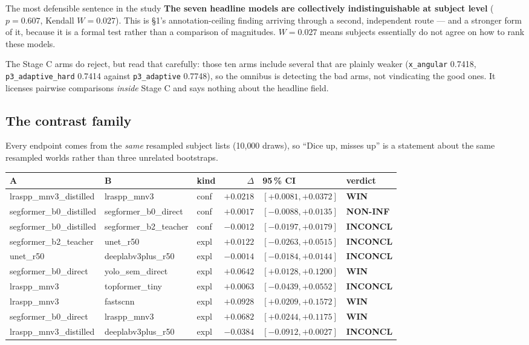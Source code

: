 \documentclass[11pt]{article}
\newcommand{\win}{\textcolor{wingreen}{\textbf{WIN}}}
\newcommand{\noninf}{\textcolor{secblue}{\textbf{NON-INF}}}
\newcommand{\inc}{\textcolor{warnamber}{\textbf{INCONCL}}}
\begin{document}
\begin{keybox}{The most defensible sentence in the study}
\textbf{The seven headline models are collectively indistinguishable at subject
level} ($p=0.607$, Kendall $W=0.027$). This is \S1's annotation-ceiling finding
arriving through a second, independent route --- and a stronger form of it,
because it is a formal test rather than a comparison of magnitudes. $W=0.027$
means subjects essentially do not agree on how to rank these models.
\end{keybox}

The Stage C arms do reject, but read that carefully: those ten arms include
several that are plainly weaker (\texttt{x\_angular} 0.7418,
\texttt{p3\_adaptive\_hard} 0.7414 against \texttt{p3\_adaptive} 0.7748), so the
omnibus is detecting the bad arms, not vindicating the good ones. It licenses
pairwise comparisons \emph{inside} Stage C and says nothing about the headline
field.

\subsection{The contrast family}

Every endpoint comes from the \emph{same} resampled subject lists (10{,}000
draws), so ``Dice up, misses up'' is a statement about the same resampled worlds
rather than three unrelated bootstraps.

\begin{center}
\small\setlength{\tabcolsep}{3.5pt}
\begin{tabular}{p{4.05cm}p{3.05cm}lnp{2.85cm}l}
\toprule
\textbf{A} & \textbf{B} & \textbf{kind} & \textbf{$\Delta$} & \textbf{95\,\% CI} & \textbf{verdict} \\
\midrule
lraspp\_mnv3\_distilled & lraspp\_mnv3 & conf & $+0.0218$ & $[+0.0081,+0.0372]$ & \win \\
segformer\_b0\_distilled & segformer\_b0\_direct & conf & $+0.0017$ & $[-0.0088,+0.0135]$ & \noninf \\
segformer\_b0\_distilled & segformer\_b2\_teacher & conf & $-0.0012$ & $[-0.0197,+0.0179]$ & \inc \\
segformer\_b2\_teacher & unet\_r50 & expl & $+0.0122$ & $[-0.0263,+0.0515]$ & \inc \\
unet\_r50 & deeplabv3plus\_r50 & expl & $-0.0014$ & $[-0.0184,+0.0144]$ & \inc \\
segformer\_b0\_direct & yolo\_sem\_direct & expl & $+0.0642$ & $[+0.0128,+0.1200]$ & \win \\
lraspp\_mnv3 & topformer\_tiny & expl & $+0.0063$ & $[-0.0439,+0.0552]$ & \inc \\
lraspp\_mnv3 & fastscnn & expl & $+0.0928$ & $[+0.0209,+0.1572]$ & \win \\
segformer\_b0\_direct & lraspp\_mnv3 & expl & $+0.0682$ & $[+0.0244,+0.1175]$ & \win \\
lraspp\_mnv3\_distilled & deeplabv3plus\_r50 & expl & $-0.0384$ & $[-0.0912,+0.0027]$ & \inc \\
\bottomrule
\end{tabular}
\end{center}
\end{document}
